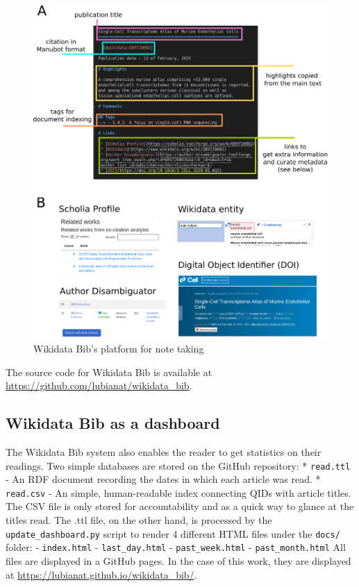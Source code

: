 \begin{figure}
\hypertarget{fig:notetaking}{%
\centering
\includegraphics{images/note_taking_station_annotated_with_links.png}
\caption{Wikidata Bib's platform for note taking}\label{fig:notetaking}
}
\end{figure}

The source code for Wikidata Bib is available at \url{https://github.com/lubianat/wikidata_bib}.

\hypertarget{wikidata-bib-as-a-dashboard}{%
\subsection{Wikidata Bib as a dashboard}\label{wikidata-bib-as-a-dashboard}}

The Wikidata Bib system also enables the reader to get statistics on their readings.
Two simple databases are stored on the GitHub repository:
* \texttt{read.ttl} - An RDF document recording the dates in which each article was read.
* \texttt{read.csv} - An simple, human-readable index connecting QIDs with article titles.
The CSV file is only stored for accountability and as a quick way to glance at the titles read.
The .ttl file, on the other hand, is processed by the \texttt{update\_dashboard.py} script to render 4 different HTML files under the \texttt{docs/} folder:
- \texttt{index.html}
- \texttt{last\_day.html}
- \texttt{past\_week.html}
- \texttt{past\_month.html}
All files are displayed in a GitHub pages.
In the case of this work, they are displayed at \url{https://lubianat.github.io/wikidata_bib/}.

